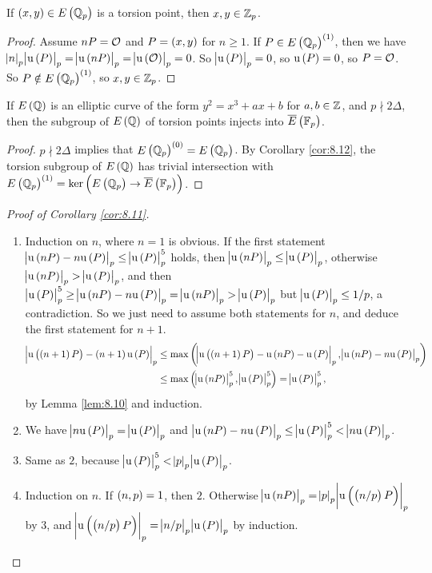 \begin{corollary}
\label{cor:8.12}
If $ \br{x, y} \in E\br{\QQ_p} $ is a torsion point, then $ x, y \in \mathbb{Z}_p $.
\end{corollary}

\begin{proof}
Assume $ nP = \mathcal{O} $ and $ P = \br{x, y} $ for $ n \ge 1 $. If $ P \in E\br{\QQ_p}^{\br{1}} $, then we have $ \abs{n}_p\abs{\u\br{P}}_p = \abs{\u\br{nP}}_p = \abs{\u\br{\OOO}}_p = 0 $. So $ \abs{\u\br{P}}_p = 0 $, so $ \u\br{P} = 0 $, so $ P = \mathcal{O} $. So $ P \notin E\br{\QQ_p}^{\br{1}} $, so $ x, y \in \mathbb{Z}_p $.
\end{proof}

\begin{corollary}
If $ E\br{\QQ} $ is an elliptic curve of the form $ y^2 = x^3 + ax + b $ for $ a, b \in \mathbb{Z} $, and $ p \nmid 2\Delta $, then the subgroup of $ E\br{\QQ} $ of torsion points injects into $ \overline{E}\br{\FF_p} $.
\end{corollary}

\begin{proof}
$ p \nmid 2\Delta $ implies that $ E\br{\QQ_p}^{\br{0}} = E\br{\QQ_p} $. By Corollary \ref{cor:8.12}, the torsion subgroup of $ E\br{\QQ} $ has trivial intersection with $ E\br{\QQ_p}^{\br{1}} = \ker \br{E\br{\QQ_p} \to \overline{E}\br{\FF_p}} $.
\end{proof}

\begin{proof}[Proof of Corollary \ref{cor:8.11}]
\hfill
\begin{enumerate}
\item Induction on $ n $, where $ n = 1 $ is obvious. If the first statement $ \abs{\u\br{nP} - n\u\br{P}}_p \le \abs{\u\br{P}}_p^5 $ holds, then $ \abs{\u\br{nP}}_p \le \abs{\u\br{P}}_p $, otherwise $ \abs{\u\br{nP}}_p > \abs{\u\br{P}}_p $, and then $ \abs{\u\br{P}}_p^5 \ge \abs{\u\br{nP} - n\u\br{P}}_p = \abs{\u\br{nP}}_p > \abs{\u\br{P}}_p $ but $ \abs{\u\br{P}}_p \le 1 / p $, a contradiction. So we just need to assume both statements for $ n $, and deduce the first statement for $ n + 1 $.
\begin{align*}
\abs{\u\br{\br{n + 1}P} - \br{n + 1}\u\br{P}}_p
& \le \max\br{\abs{\u\br{\br{n + 1}P} - \u\br{nP} - \u\br{P}}_p, \abs{\u\br{nP} - n\u\br{P}}_p} \\
& \le \max\br{\abs{\u\br{nP}}_p^5, \abs{\u\br{P}}_p^5}
= \abs{\u\br{P}}_p^5,
\end{align*}
by Lemma \ref{lem:8.10} and induction.
\item We have $ \abs{n\u\br{P}}_p = \abs{\u\br{P}}_p $ and $ \abs{\u\br{nP} - n\u\br{P}}_p \le \abs{\u\br{P}}_p^5 < \abs{n\u\br{P}}_p $.
\item Same as $ 2 $, because $ \abs{\u\br{P}}_p^5 < \abs{p}_p\abs{\u\br{P}}_p $.
\item Induction on $ n $. If $ \br{n, p} = 1 $, then $ 2 $. Otherwise $ \abs{\u\br{nP}}_p = \abs{p}_p\abs{\u\br{\br{n / p}P}}_p $ by $ 3 $, and $ \abs{\u\br{\br{n / p}P}}_p = \abs{n / p}_p\abs{\u\br{P}}_p $ by induction.
\end{enumerate}
\end{proof}


